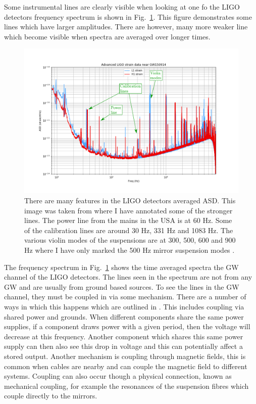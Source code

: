 Some instrumental lines are clearly visible when looking at one fo the \ac{LIGO} detectors frequency spectrum is shown in Fig.~\ref{detchar:line:psd}. This figure demonstrates some lines which have larger amplitudes. There are however, many more weaker line which become visible when spectra are averaged over longer times.
\begin{figure}
    \centering
    \includegraphics[width=\textwidth]{C5_detchar/ligo_o1_asd_annot.pdf}
    \caption{There are many features in the \ac{LIGO} detectors averaged \ac{ASD}. This image was taken from \citep{GWOpen} where I have annotated some of the stronger lines. The power line from the mains in the USA is at 60 Hz. Some of the calibration lines are around 30 Hz, 331 Hz and 1083 Hz. The various violin modes of the suspensions are at 300, 500, 600 and 900 Hz where I have only marked the 500 Hz mirror suspension modes \citep{GWOpen}.}
    \label{detchar:line:psd}
\end{figure}
The frequency spectrum in Fig.~\ref{detchar:line:psd} shows the time averaged spectra the \ac{GW} channel of the \ac{LIGO} detectors. 
The lines seen in the spectrum are not from any \ac{GW} and are usually from ground based sources.
To see the lines in the \ac{GW} channel, they must be coupled in via some mechanism. 
There are a number of ways in which this happens which are outlined in \citep{covas2018IdentificationMitigation}.
This includes coupling via shared power and grounds. 
When different components share the same power supplies, if a component draws power with a given period, then the voltage will decrease at this frequency. 
Another component which shares this same power supply can then also see this drop in voltage and this can potentially affect a stored output. 
Another mechanism is coupling through magnetic fields, this is common when cables are nearby and can couple the magnetic field to different systems.
Coupling can also occur though a physical connection, known as mechanical coupling, for example the resonances of the suspension fibres which couple directly to the mirrors.

